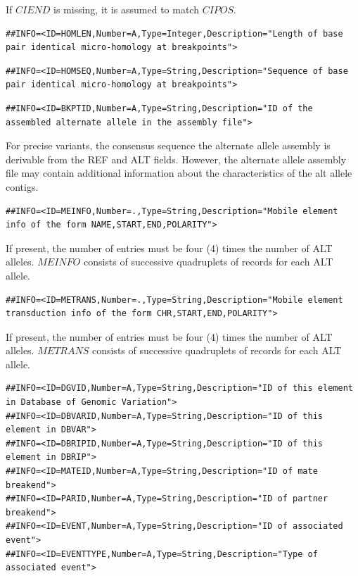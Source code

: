 \documentclass[8pt]{article}
\begin{document}
If $CIEND$ is missing, it is assumed to match $CIPOS$.

\footnotesize
\begin{verbatim}
##INFO=<ID=HOMLEN,Number=A,Type=Integer,Description="Length of base pair identical micro-homology at breakpoints">
\end{verbatim}
\normalsize
\footnotesize
\begin{verbatim}
##INFO=<ID=HOMSEQ,Number=A,Type=String,Description="Sequence of base pair identical micro-homology at breakpoints">
\end{verbatim}
\normalsize
\footnotesize
\begin{verbatim}
##INFO=<ID=BKPTID,Number=A,Type=String,Description="ID of the assembled alternate allele in the assembly file">
\end{verbatim}
\normalsize
For precise variants, the consensus sequence the alternate allele assembly is derivable from the REF and ALT fields.
However, the alternate allele assembly file may contain additional information about the characteristics of the alt allele contigs.

\footnotesize
\begin{verbatim}
##INFO=<ID=MEINFO,Number=.,Type=String,Description="Mobile element info of the form NAME,START,END,POLARITY">
\end{verbatim}
\normalsize

If present, the number of entries must be four (4) times the number of ALT alleles.
$MEINFO$ consists of successive quadruplets of records for each ALT allele.

\footnotesize
\begin{verbatim}
##INFO=<ID=METRANS,Number=.,Type=String,Description="Mobile element transduction info of the form CHR,START,END,POLARITY">
\end{verbatim}
\normalsize

If present, the number of entries must be four (4) times the number of ALT alleles.
$METRANS$ consists of successive quadruplets of records for each ALT allele.

\footnotesize
\begin{verbatim}
##INFO=<ID=DGVID,Number=A,Type=String,Description="ID of this element in Database of Genomic Variation">
##INFO=<ID=DBVARID,Number=A,Type=String,Description="ID of this element in DBVAR">
##INFO=<ID=DBRIPID,Number=A,Type=String,Description="ID of this element in DBRIP">
##INFO=<ID=MATEID,Number=A,Type=String,Description="ID of mate breakend">
##INFO=<ID=PARID,Number=A,Type=String,Description="ID of partner breakend">
##INFO=<ID=EVENT,Number=A,Type=String,Description="ID of associated event">
##INFO=<ID=EVENTTYPE,Number=A,Type=String,Description="Type of associated event">
\end{verbatim}
\normalsize
\end{document}
